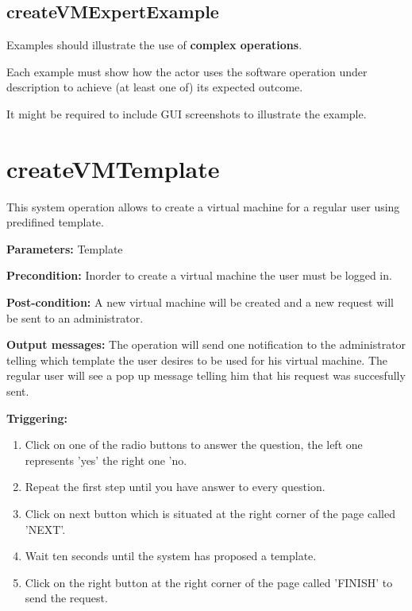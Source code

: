  
\subsection{createVMExpertExample}
Examples should illustrate the use of \textbf{complex operations}.

Each example must show how the actor uses the software operation under
description to achieve (at least one of) its expected outcome.

It might be required to include GUI screenshots to illustrate the example.







\section{createVMTemplate}
\label{operation:createVMTemplate}
This system operation allows to create a virtual machine for a regular user
using predifined template.

\begin{description}

\item \textbf{Parameters:} Template
\item \textbf{Precondition:} Inorder to create a virtual machine the user must
be logged in.
\item \textbf{Post-condition:} A new virtual machine will be created and a new
request will be sent to an administrator.
\item \textbf{Output messages:} The operation will send one notification to the
administrator telling which template the user desires to be used for his virtual
machine. The regular user will see a pop up message telling him that his request
was succesfully sent.

\item \textbf{Triggering:}
\begin{enumerate}
\item Click on one of the radio buttons to answer the question, the left one
represents 'yes' the right one 'no.
\item Repeat the first step until you have answer to every question.
\item Click on next button which is situated at the right corner of the page
called 'NEXT'.
\item Wait ten seconds until the system has proposed a template.
\item Click on the right button at the right corner of the page called 'FINISH'
to send the request.
\end{enumerate}

 
\end{description}

